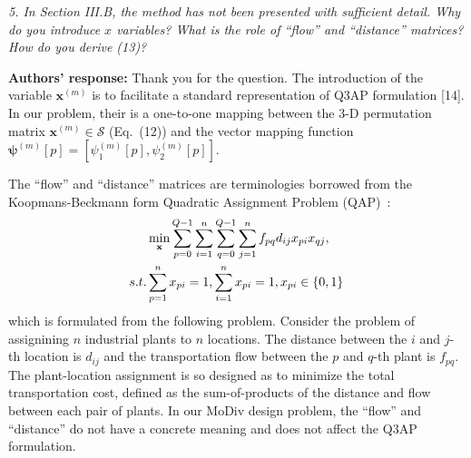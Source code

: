\documentclass[onecolumn, 11pt, draftclsnofoot]{IEEEtran}
\begin{document}
\noindent
\emph{5. In Section III.B, the method has not been presented with sufficient
detail. Why do you introduce $x$ variables? What is the role of ``flow'' and
``distance'' matrices? How do you derive (13)?}

\noindent \textbf{Authors' response:}
Thank you for the question. The introduction of the variable $\mathbf{x}^{(m)}$
is to facilitate a standard representation of Q3AP formulation
[14]\citep[R][]{frieze1974bilinear}\citep[R][]{balas1991algorithm}\citep[R][]{burkard1999linear}\citep[R][]{5587019}.
In our problem, their is a one-to-one mapping between the 3-D permutation matrix
$\mathbf{x}^{(m)}\in\mathcal{S}$ (Eq.~(12)) and the vector mapping function
$\bm{\psi}^{(m)}[p] = [\psi_1^{(m)}[p], \psi_2^{(m)}[p]]$. 

The ``flow'' and ``distance'' matrices are terminologies borrowed from the
Koopmans-Beckmann form Quadratic Assignment Problem
(QAP)~\citep[R][]{koopmans1957assignment}\citep[R][]{806935}:
\begin{align}
  & \min_{\mathbf{x}}
  \sum_{p=0}^{Q-1}\sum_{i=1}^{n}
  \sum_{q=0}^{Q-1}\sum_{j=1}^{n}
  f_{pq}d_{ij}x_{pi}x_{qj},\notag\\
  \mbox{s.t. } & \sum_{p=1}^{n}x_{pi} =
  1,\sum_{i=1}^{n}x_{pi} = 1, x_{pi}\in\{0, 1\}
\end{align}
which is formulated from the following problem. Consider the problem of
assignining $n$ industrial plants to $n$ locations. The distance between the $i$
and $j$-th location is $d_{ij}$ and the transportation flow between the $p$ and
$q$-th plant is $f_{pq}$. The plant-location assignment is so designed as to
minimize the total transportation cost, defined as the sum-of-products of the
distance and flow between each pair of plants. In our MoDiv design problem, the
``flow'' and ``distance'' do not have a concrete meaning and does not affect
the Q3AP formulation.
\end{document}
